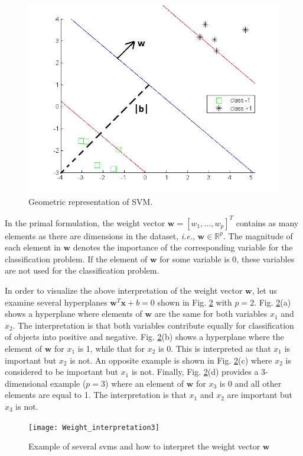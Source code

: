 \begin{figure}[h!]
	\centering
	\includegraphics[width=0.7\linewidth]{images/SVM_interpretation2}
	\caption{Geometric representation of SVM.}
	\label{fig:SVM_interpretation}
\end{figure}

In the primal formulation, the weight vector $\textbf{w} = [w_1, \ldots, w_p]^T$ contains as many elements as there are dimensions in the dataset, \textit{i.e.}, $\textbf{w} \in \mathbb{R}^p$. The magnitude of each element in $\textbf{w}$ denotes the importance of the corresponding variable for the classification problem. If the element of $\textbf{w}$ for some variable is 0, these variables are not used for the classification problem.

In order to visualize the above interpretation of the weight vector $\textbf{w}$, let us examine several hyperplanes $\textbf{w}^T\textbf{x}+b=0$ shown in Fig. \ref*{fig:Weight_interpretation} with $p=2$. Fig. \ref{fig:Weight_interpretation}(a) shows a hyperplane where elements of $\textbf{w}$ are the same for both variables $x_1$ and $x_2$. The interpretation is that both variables contribute equally for classification of objects into positive and negative. Fig. \ref{fig:Weight_interpretation}(b) shows a hyperplane where the element of $\textbf{w}$ for $x_1$ is 1, while that for $x_2$ is 0. This is interpreted as that $x_1$ is important but $x_2$ is not. An opposite example is shown in Fig. \ref{fig:Weight_interpretation}(c) where $x_2$ is considered to be important but $x_1$ is not. Finally, Fig. \ref{fig:Weight_interpretation}(d) provides a 3-dimensional example ($p=3$) where an element of $\textbf{w}$ for $x_3$ is 0 and all other elements are equal to 1. The interpretation is that $x_1$ and $x_2$ are important but $x_3$ is not.

\begin{figure}[h!]
	\centering
	\texttt{[image: Weight\_interpretation3]}
	\caption{Example of several {\sc svm}s and how to interpret the weight vector $\textbf{w}$}
	\label{fig:Weight_interpretation}
\end{figure}

